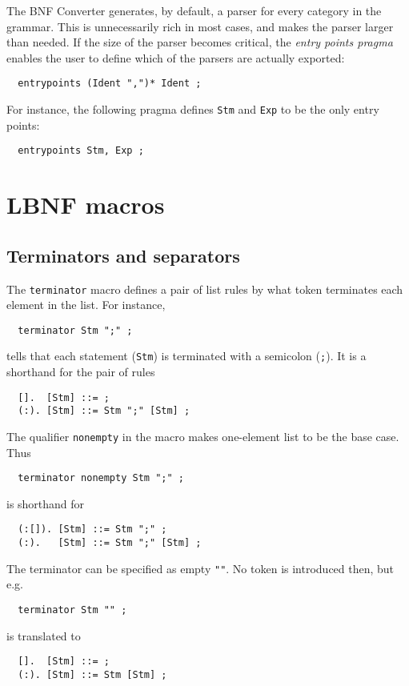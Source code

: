 \documentclass[10pt]{article}
\begin{document}
The BNF Converter generates, by default, a parser for every category in
the grammar. This is unnecessarily rich in most cases, and makes the parser
larger than needed. If the size of the parser becomes critical,
the \textit{entry points pragma} enables the user
to define which of the parsers are actually exported:
\begin{verbatim}
  entrypoints (Ident ",")* Ident ;
\end{verbatim}
For instance, the following pragma defines {\tt Stm} and {\tt Exp} to be
the only entry points:
\begin{verbatim}
  entrypoints Stm, Exp ;
\end{verbatim}


\section{LBNF macros}
\label{macros}

\subsection{Terminators and separators}
\label{terminator}

The \verb$terminator$ macro defines a pair of list rules by what
token terminates each element in the list. For instance,
\begin{verbatim}
  terminator Stm ";" ;
\end{verbatim}
tells that each statement (\verb$Stm$) is terminated with a semicolon
(\verb$;$). It is a shorthand for the pair of rules
\begin{verbatim}
  [].  [Stm] ::= ;
  (:). [Stm] ::= Stm ";" [Stm] ;
\end{verbatim}
The qualifier \verb$nonempty$ in the macro makes one-element list
to be the base case. Thus
\begin{verbatim}
  terminator nonempty Stm ";" ;
\end{verbatim}
is shorthand for
\begin{verbatim}
  (:[]). [Stm] ::= Stm ";" ;
  (:).   [Stm] ::= Stm ";" [Stm] ;
\end{verbatim}
The terminator can be specified as empty \verb$""$. No token is
introduced then, but e.g.
\begin{verbatim}
  terminator Stm "" ;
\end{verbatim}
is translated to
\begin{verbatim}
  [].  [Stm] ::= ;
  (:). [Stm] ::= Stm [Stm] ;
\end{verbatim}
\end{document}
